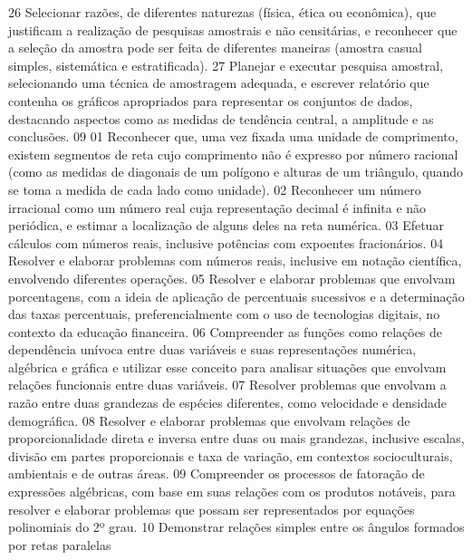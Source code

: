 {{{			}
			{26}{%
				Selecionar razões, de diferentes naturezas (física, ética ou econômica), que
				justificam a realização de pesquisas amostrais e não censitárias, e reconhecer que a seleção
				da amostra pode ser feita de diferentes maneiras (amostra casual simples, sistemática e
				estratificada).
			}
			{27}{%
				Planejar e executar pesquisa amostral, selecionando uma técnica de amostragem
				adequada, e escrever relatório que contenha os gráficos apropriados para representar os
				conjuntos de dados, destacando aspectos como as medidas de tendência central, a amplitude
				e as conclusões.
			}
	}
	{09}{%
		{01}{%
				Reconhecer que, uma vez fixada uma unidade de comprimento, existem
				segmentos de reta cujo comprimento não é expresso por número racional (como as medidas
				de diagonais de um polígono e alturas de um triângulo, quando se toma a medida de cada lado
				como unidade).
			}
			{02}{%
				Reconhecer um número irracional como um número real cuja representação
				decimal é infinita e não periódica, e estimar a localização de alguns deles na reta numérica.
			}
			{03}{%
				Efetuar cálculos com números reais, inclusive potências com expoentes
				fracionários.
			}
			{04}{%
				Resolver e elaborar problemas com números reais, inclusive em notação
				científica, envolvendo diferentes operações.
			}
			{05}{%
				Resolver e elaborar problemas que envolvam porcentagens, com a ideia de
				aplicação de percentuais sucessivos e a determinação das taxas percentuais, preferencialmente
				com o uso de tecnologias digitais, no contexto da educação financeira.
			}
			{06}{%
				Compreender as funções como relações de dependência unívoca entre duas
				variáveis e suas representações numérica, algébrica e gráfica e utilizar esse conceito para
				analisar situações que envolvam relações funcionais entre duas variáveis.
			}
			{07}{%
				Resolver problemas que envolvam a razão entre duas grandezas de espécies
				diferentes, como velocidade e densidade demográfica.
			}
			{08}{%
				Resolver e elaborar problemas que envolvam relações de proporcionalidade
				direta e inversa entre duas ou mais grandezas, inclusive escalas, divisão em partes
				proporcionais e taxa de variação, em contextos socioculturais, ambientais e de outras áreas.
			}
			{09}{%
				Compreender os processos de fatoração de expressões algébricas, com base em
				suas relações com os produtos notáveis, para resolver e elaborar problemas que possam ser
				representados por equações polinomiais do 2º grau.
			}
			{10}{%
				Demonstrar relações simples entre os ângulos formados por retas paralelas
}}}

